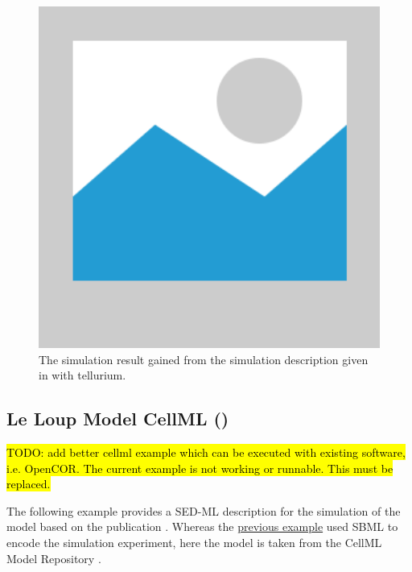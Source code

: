 \begin{figure}[ht]
\begin{minipage}{0.47\textwidth}
        \includegraphics[width=1.0\textwidth]{examples/placeholder}
        \caption{The simulation result gained from the simulation description given in  with tellurium.}
    \end{minipage}
    \label{fig:leloup-sbml}
\end{figure}



\subsection{Le Loup Model CellML ()}
\label{example:leloup_cellml}

\hl{TODO: add better cellml example which can be executed with existing software, i.e. OpenCOR. The current example is not working or runnable. This must be replaced.}

The following example provides a SED-ML description for the simulation of the model based on the publication \citep{LeLoup1999}. Whereas the \hyperref[example:leloup_sbml]{previous example} used SBML to encode the simulation experiment, here the model is taken from the CellML Model Repository \citep{LLH+08}.



